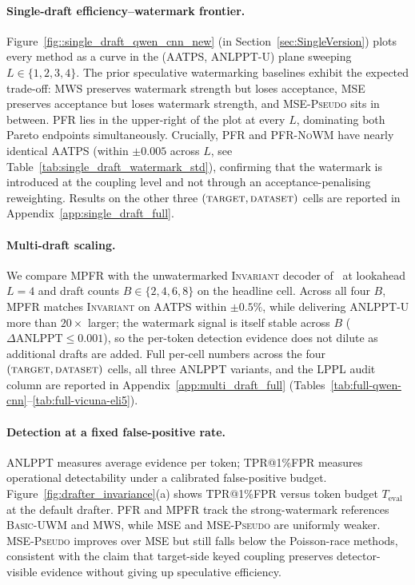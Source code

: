 \paragraph{Single-draft efficiency--watermark frontier.}
Figure~\ref{fig::single_draft_qwen_cnn_new} (in Section~\ref{sec:SingleVersion})
plots every method as a curve in the (AATPS, ANLPPT-U) plane sweeping
$L\in\{1,2,3,4\}$. The prior speculative watermarking baselines exhibit the
expected trade-off: \textsc{MWS} preserves watermark strength but loses
acceptance, \textsc{MSE} preserves acceptance but loses watermark strength, and
\textsc{MSE-Pseudo} sits in between. \textsc{PFR} lies in the upper-right of
the plot at every $L$, dominating both Pareto endpoints simultaneously.
Crucially, \textsc{PFR} and \textsc{PFR-NoWM} have nearly identical AATPS
(within $\pm 0.005$ across $L$, see
Table~\ref{tab:single_draft_watermark_std}), confirming that the watermark is
introduced at the coupling level and not through an
acceptance-penalising reweighting. Results on the other three
$(\textsc{target},\textsc{dataset})$ cells are reported in
Appendix~\ref{app:single_draft_full}.

\paragraph{Multi-draft scaling.}
We compare \textsc{MPFR} with the unwatermarked \textsc{Invariant} decoder
of~\citet{rowan2025list} at lookahead $L{=}4$ and draft counts
$B\in\{2,4,6,8\}$ on the headline cell. Across all four $B$, \textsc{MPFR}
matches \textsc{Invariant} on AATPS within $\pm 0.5\%$, while delivering
ANLPPT-U more than $20\times$ larger; the watermark signal is itself stable
across $B$ ($\Delta\mathrm{ANLPPT}\!\le\!0.001$), so the per-token detection
evidence does not dilute as additional drafts are added. Full per-cell
numbers across the four $(\textsc{target},\textsc{dataset})$ cells, all
three ANLPPT variants, and the LPPL audit column are reported in
Appendix~\ref{app:multi_draft_full}
(Tables~\ref{tab:full-qwen-cnn}--\ref{tab:full-vicuna-eli5}).

\paragraph{Detection at a fixed false-positive rate.}
ANLPPT measures average evidence per token; TPR@1\%FPR measures operational
detectability under a calibrated false-positive budget.
Figure~\ref{fig:drafter_invariance}(a) shows TPR@1\%FPR versus token budget
$T_{\mathrm{eval}}$ at the default drafter. \textsc{PFR} and \textsc{MPFR}
track the strong-watermark references \textsc{Basic-UWM} and \textsc{MWS},
while \textsc{MSE} and \textsc{MSE-Pseudo} are uniformly weaker.
\textsc{MSE-Pseudo} improves over \textsc{MSE} but still falls below the
Poisson-race methods, consistent with the claim that target-side keyed coupling
preserves detector-visible evidence without giving up speculative efficiency.

